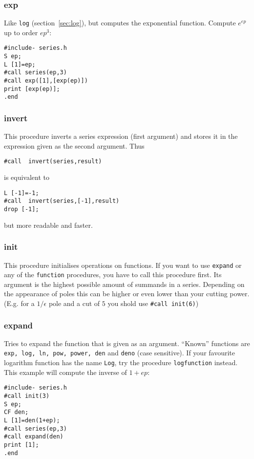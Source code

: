 \documentclass{article}
\begin{document}
\subsubsection{exp}
\label{sec:exp}

Like {\tt log} (section~\ref{sec:log}), but computes the
exponential function. Compute $e^{ep}$ up to order $ep^3$:
\begin{verbatim}
#include- series.h
S ep;
L [1]=ep;
#call series(ep,3)
#call exp([1],[exp(ep)])
print [exp(ep)];
.end
\end{verbatim}


\subsubsection{invert}
\label{sec:invert}

This procedure inverts a series expression (first argument) and stores
it in the expression given as the second argument. Thus
\begin{verbatim}
#call  invert(series,result)
\end{verbatim}
is equivalent to 
\begin{verbatim}
L [-1]=-1;
#call  invert(series,[-1],result)
drop [-1];
\end{verbatim}
but more readable and faster.

\subsubsection{init}
\label{sec:invert}

This procedure initialises operations on functions. If you want to use
{\tt expand} or any of the {\tt *function} procedures, you have to call
this procedure first. Its argument is the highest possible amount of
summands in a series. Depending on the appearance of poles this can be
higher or even lower than your cutting power. (E.g. for a $1/\epsilon$
pole and a cut of $5$ you shold use {\tt \#call init(6)})

\subsubsection{expand}
\label{sec:expand}

Tries to expand the function that is given as an argument. ``Known''
functions are {\tt exp, log, ln, pow, power, den} and {\tt deno} (case sensitive). If
your favourite logarithm function has the name {\tt Log}, try the
procedure {\tt logfunction} instead. This example will compute the
inverse of $1+ep$:
\begin{verbatim}
#include- series.h
#call init(3)
S ep;
CF den;
L [1]=den(1+ep);
#call series(ep,3)
#call expand(den)
print [1];
.end
\end{verbatim}
\end{document}
